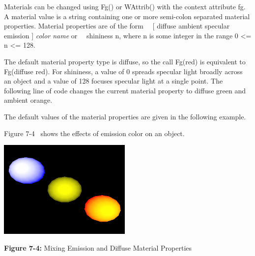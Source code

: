 Materials can be changed using Fg() or WAttrib() with the context
attribute fg. A material value is a string containing one or more
semi-colon separated material properties. Material properties are of
the form\newline
\ \ [ diffuse {\textbar} ambient {\textbar} specular {\textbar} emission
] \textit{color name} \newline
or \newline
\ \ {\textquotedbl}shininess n{\textquotedbl}, where n is some integer
in the range 0 {\textless}= n
{\textless}= 128.

The default material property type is diffuse, so the call
Fg({\textquotedbl}red{\textquotedbl}) is equivalent to
Fg({\textquotedbl}diffuse red{\textquotedbl}). For shininess, a value
of 0 spreads specular light broadly across an object and a value of 128
focuses specular light at a single point. The following line of code
changes the current material property to diffuse green and ambient
orange. 


\noindent The default values of the material properties are given in the
following example. 


\noindent Figure 7-4 \ shows the effects of emission color on an object. 

\bigskip

{\centering 
\includegraphics[width=2.5583in,height=1.8835in]{ub-img/ub-img34.png}
\par}

{\sffamily\bfseries Figure 7-4:}
{\sffamily Mixing Emission and Diffuse Material Properties}

\bigskip


